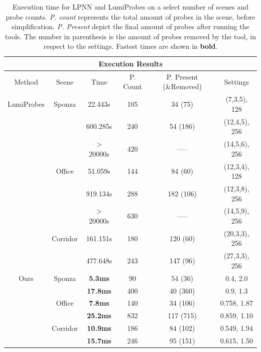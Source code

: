 \begin{table}
	\centering
\begin{tabular}{ |c||c|c|c|c|c|  }
	\hline
	\multicolumn{6}{|c|}{Execution Results} \\
	\hline
	Method & Scene & Time & P. Count & P. Present (\&Removed) & Settings\\
	\hline
	LumiProbes & Sponza   & 22.443s  & 105 & 34 (75)  & (7,3,5), 128 \\
			   &          & 600.285s & 240 & 54 (186) & (12,4,5), 256 \\
			   &          & $>$20000s & 420 & -----   & (14,5,6), 256 \\
	\cline{2-6}
	           & Office   & 51.059s  & 144 & 84 (60)  & (12,3,4), 128\\
	           &          & 919.134s & 288 & 182 (106)& (12,3,8), 256\\
	           &          & $>$20000s & 630 & -----   & (14,5,9), 256\\
	\cline{2-6}
	           & Corridor & 161.151s & 180 & 120 (60) & (20,3,3), 256\\
	           &          & 477.648s & 243 & 147 (96) & (27,3,3), 256\\
	\hline
	\hline
	Ours       & Sponza   & \textbf{5.3ms}  & 90  & 54 (36)   & 0.4, 2.0 \\
			   &          & \textbf{17.8ms} & 400 & 40 (360)  & 0.9, 1.3 \\
	\cline{2-6}
			   & Office   & \textbf{7.8ms}  & 140 & 34 (106)  & 0.758, 1.87 \\
               &          & \textbf{25.2ms} & 832 & 117 (715) & 0.859, 1.10 \\
    \cline{2-6}
    		   & Corridor & \textbf{10.9ms} & 186 & 84 (102)  & 0.549, 1.94 \\
               &          & \textbf{15.7ms} & 246 & 95 (151)  & 0.615, 1.50 \\
               
	\hline
\end{tabular}
\caption{Execution time for LPNN and LumiProbes on a select number of scenes and probe counts. \textit{P. count} represents the total amount of probes in the scene, before simplification. \textit{P. Present} depict the final amount of probes after running the tools. The number in parenthesis is the amount of probes removed by the tool, in respect to the settings. Fastest times are shown in \textbf{bold}.}
\label{table:times}
\end{table}

